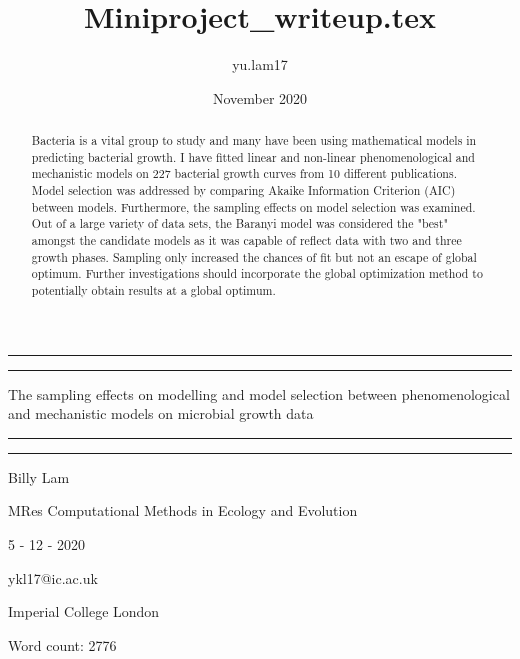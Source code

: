\documentclass[11pt, a4paper]{article} %
\title{Miniproject_writeup.tex}
\author{yu.lam17 }
\date{November 2020}
\begin{document}
\begin{titlepage} %

	\centering 
	
	\vspace*{\baselineskip} 
	
	\rule{\textwidth}{1.6pt}\vspace*{-\baselineskip}\vspace*{2pt} %
	\rule{\textwidth}{0.4pt} %
	
	\vspace{0.75\baselineskip} 
	
	{\huge The sampling effects on modelling and model selection between phenomenological and mechanistic models on
	microbial growth data} %
	
	\vspace{0.75\baselineskip} 
	
	\rule{\textwidth}{0.4pt}\vspace*{-\baselineskip}\vspace{3.2pt} %
	\rule{\textwidth}{1.6pt} %
		
	\vspace{2\baselineskip} %
	
	{\LARGE Billy Lam} %
	\vspace*{0.75\baselineskip} 
	
	\Large 
	MRes Computational Methods in Ecology and Evolution 
	\vspace*{0.75\baselineskip} 
	
	5 - 12 - 2020
	\vspace*{0.75\baselineskip} 

	ykl17@ic.ac.uk
	\vspace*{3\baselineskip} 
	
	Imperial College London
	\vspace*{3\baselineskip} 
    
    Word count: 2776
	
\end{titlepage}

\begin{center}
    \Large
    \begin{abstract}
    Bacteria is a vital group to study and many have been using mathematical models in predicting bacterial growth. I have fitted linear and non-linear phenomenological and mechanistic models on 227 bacterial growth curves from 10 different publications. Model selection was addressed by comparing Akaike Information Criterion (AIC) between models. Furthermore, the sampling effects on model selection was examined. Out of a large variety of data sets, the Baranyi model was considered the "best" amongst the candidate models as it was capable of reflect data with two and three growth phases. Sampling only increased the chances of fit but not an escape of global optimum. Further investigations should incorporate the global optimization method to potentially obtain results at a global optimum.
\end{abstract}
\end{center}
\end{document}
